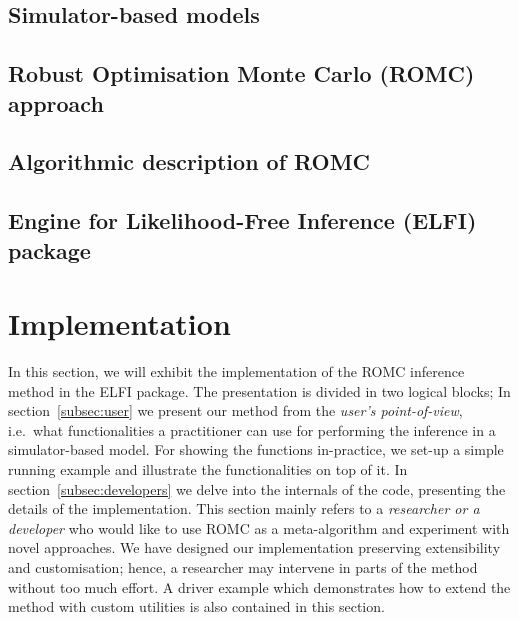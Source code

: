 \documentclass[11pt,twoside]{article}
\numberwithin{Theorem}{section}
\numberwithin{Definition}{section}
\numberwithin{Lemma}{section}
\numberwithin{Algorithm}{section}
\numberwithin{equation}{section}
\begin{document}
\subsection{Simulator-based models}
% 


\subsection{Robust Optimisation Monte Carlo (ROMC) approach}
\label{subsec:ROMC}
% 


\subsection{Algorithmic description of ROMC}
\label{subsec:romc-algorithmic}
% 


\subsection{Engine for Likelihood-Free Inference (ELFI) package}
\label{subsec:elfi}
% 


\clearpage
\section{Implementation}
In this section, we will exhibit the implementation of the ROMC
inference method in the ELFI package. The presentation is divided in
two logical blocks; In section~\ref{subsec:user} we present our method from the \emph{user's point-of-view}, i.e.\ what functionalities a practitioner can use for performing the inference in a simulator-based model. For showing the functions in-practice, we set-up a simple running example and
illustrate the functionalities on top of it. In section~\ref{subsec:developers} we delve into the internals of the
code, presenting the details of the implementation. This
section mainly refers to a \emph{researcher or a developer} who
would like to use ROMC as a meta-algorithm and experiment with novel
approaches. We have designed our implementation preserving
extensibility and customisation; hence, a researcher may intervene in
parts of the method without too much effort. A driver example which
demonstrates how to extend the method with custom utilities is
also contained in this section.
\end{document}
